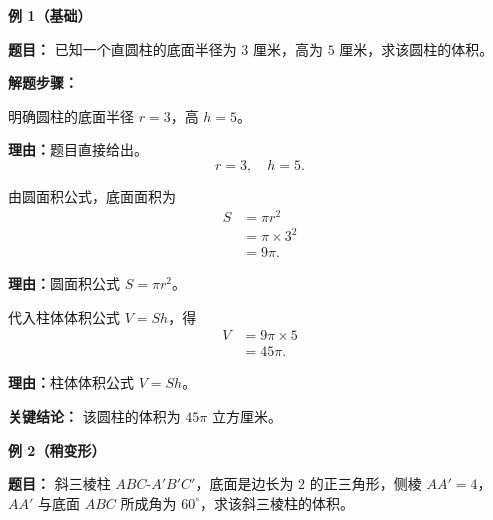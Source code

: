\begin{examplebox}
	\textbf{\textcolor{CExample}{例 1（基础）}}

	\textbf{\textcolor{CExample}{题目：}}
	已知一个直圆柱的底面半径为 $3$ 厘米，高为 $5$ 厘米，求该圆柱的体积。

	\textbf{\textcolor{CExample}{解题步骤：}}
	\begin{description}[style=nextline, leftmargin=2.8em, labelsep=0.5em, itemsep=0.45em]
		\item[\textbf{第一步（找条件）：}] 明确圆柱的底面半径 $r=3$，高 $h=5$。
			\par\textbf{理由：}题目直接给出。
			\[
				r=3,\quad h=5.
			\]
		\item[\textbf{第二步（算底面积）：}] 由圆面积公式，底面面积为
			\[
				\begin{aligned}
					S &= \pi r^2 \\
					&= \pi \times 3^2 \\
					&= 9\pi.
			\end{aligned}
			\]
			\par\textbf{理由：}圆面积公式 $S=\pi r^2$。
		\item[\textbf{第三步（代公式）：}] 代入柱体体积公式 $V=Sh$，得
			\[
				\begin{aligned}
					V &= 9\pi \times 5 \\
					&= 45\pi.
			\end{aligned}
			\]
			\par\textbf{理由：}柱体体积公式 $V=Sh$。
	\end{description}

	\textbf{\textcolor{CExample}{关键结论：}}
	该圆柱的体积为 $45\pi$ 立方厘米。

	\medskip
	\textbf{\textcolor{CExample}{例 2（稍变形）}}

	\textbf{\textcolor{CExample}{题目：}}
	斜三棱柱 $ABC$-$A'B'C'$，底面是边长为 $2$ 的正三角形，侧棱 $AA'=4$，$AA'$ 与底面 $ABC$ 所成角为 $60^\circ$，求该斜三棱柱的体积。


\end{examplebox}

